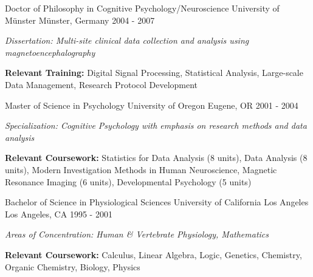 

\begin{cventries}

    \cventry
      {Doctor of Philosophy in Cognitive Psychology/Neuroscience} %
      {University of Münster} %
      {Münster, Germany} %
      {2004 - 2007} %
      {
        \begin{cvitems} %
          \item {\textit{Dissertation: Multi-site clinical data collection and analysis using magnetoencephalography}}
          \item {\textbf{Relevant Training:} Digital Signal Processing, Statistical Analysis, Large-scale Data Management, Research Protocol Development}
        \end{cvitems}
      }

    \cventry
      {Master of Science in Psychology} %
      {University of Oregon} %
      {Eugene, OR} %
      {2001 - 2004} %
      {
        \begin{cvitems} %
          \item {\textit{Specialization: Cognitive Psychology with emphasis on research methods and data analysis}}
          \item {\textbf{Relevant Coursework:} Statistics for Data Analysis (8 units), Data Analysis (8 units), Modern Investigation Methods in Human Neuroscience, Magnetic Resonance Imaging (6 units), Developmental Psychology (5 units)}
        \end{cvitems}
      }

    \cventry
      {Bachelor of Science in Physiological Sciences} %
      {University of California Los Angeles} %
      {Los Angeles, CA} %
      {1995 - 2001} %
      {
        \begin{cvitems} %
          \item {\textit{Areas of Concentration: Human \& Vertebrate Physiology, Mathematics}}
          \item {\textbf{Relevant Coursework:} Calculus, Linear Algebra, Logic, Genetics, Chemistry, Organic Chemistry, Biology, Physics}
        \end{cvitems}
      }
  \end{cventries}
